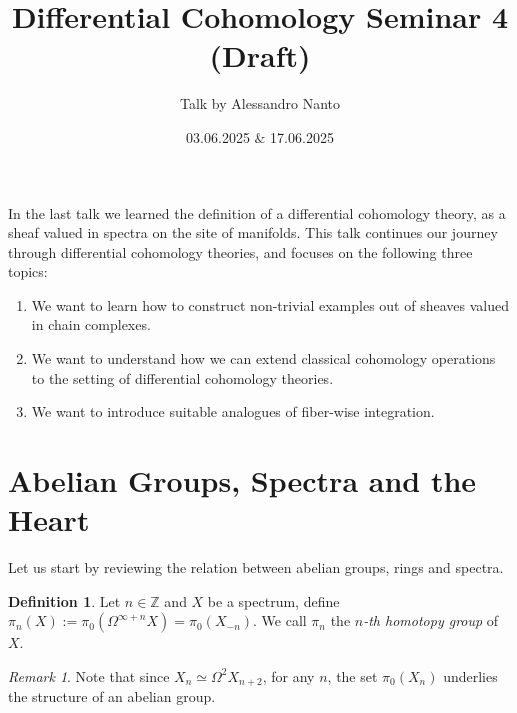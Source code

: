 \documentclass[10pt]{amsart}
\title{Differential Cohomology Seminar 4 (Draft)}
\date{03.06.2025 $\&$ 17.06.2025}
\author{Talk by Alessandro Nanto}
\newcommand{\bZ}{\mathbb{Z}}
\theoremstyle{definition}
\newtheorem{definition}[equation]{Definition}
\theoremstyle{remark}
\newtheorem{remark}[equation]{Remark}
\numberwithin{equation}{section}
\begin{document}
\maketitle

In the last talk we learned the definition of a differential cohomology theory, as a sheaf valued in spectra on the site of manifolds. This talk continues our journey through differential cohomology theories, and focuses on the following three topics:
\begin{enumerate}
  \item We want to learn how to construct non-trivial examples out of sheaves valued in chain complexes.
  \item We want to understand how we can extend classical cohomology operations to the setting of differential cohomology theories.
  \item We want to introduce suitable analogues of fiber-wise integration.  
\end{enumerate}

\section{Abelian Groups, Spectra and the Heart}
Let us start by reviewing the relation between abelian groups, rings and spectra. 
\begin{definition}
    Let $n\in\bZ$ and $X$ be a spectrum, define $\pi_n(X):=\pi_0(\Omega^{\infty+n}X)=\pi_0(X_{-n})$. We call $\pi_n$ the \textit{$n$-th homotopy group} of $X$. 
\end{definition}
\begin{remark}
 Note that since $X_n\simeq\Omega^2X_{n+2}$, for any $n$, the set $\pi_0(X_n)$ underlies the structure of an abelian group.
\end{remark}
\end{document}
